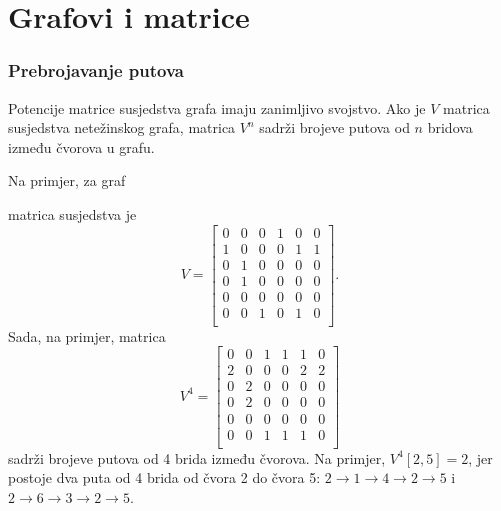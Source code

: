 \section{Grafovi i matrice}

\subsubsection{Prebrojavanje putova}

Potencije matrice susjedstva grafa
imaju zanimljivo svojstvo.
Ako je $V$ matrica susjedstva netežinskog grafa,
matrica $V^n$ sadrži brojeve putova od
$n$ bridova između čvorova u grafu.

Na primjer, za graf
\begin{center}
\end{center}
matrica susjedstva je
\[
V= \begin{bmatrix}
  0 & 0 & 0 & 1 & 0 & 0 \\
  1 & 0 & 0 & 0 & 1 & 1 \\
  0 & 1 & 0 & 0 & 0 & 0 \\
  0 & 1 & 0 & 0 & 0 & 0 \\
  0 & 0 & 0 & 0 & 0 & 0 \\
  0 & 0 & 1 & 0 & 1 & 0 \\
 \end{bmatrix}.
\]
Sada, na primjer, matrica
\[
V^4= \begin{bmatrix}
  0 & 0 & 1 & 1 & 1 & 0 \\
  2 & 0 & 0 & 0 & 2 & 2 \\
  0 & 2 & 0 & 0 & 0 & 0 \\
  0 & 2 & 0 & 0 & 0 & 0 \\
  0 & 0 & 0 & 0 & 0 & 0 \\
  0 & 0 & 1 & 1 & 1 & 0 \\
 \end{bmatrix}
\]
sadrži brojeve putova od 4 brida
između čvorova.
Na primjer, $V^4[2,5]=2$,
jer postoje dva puta od 4 brida
od čvora 2 do čvora 5:
$2 \rightarrow 1 \rightarrow 4 \rightarrow 2 \rightarrow 5$
i 
$2 \rightarrow 6 \rightarrow 3 \rightarrow 2 \rightarrow 5$.

